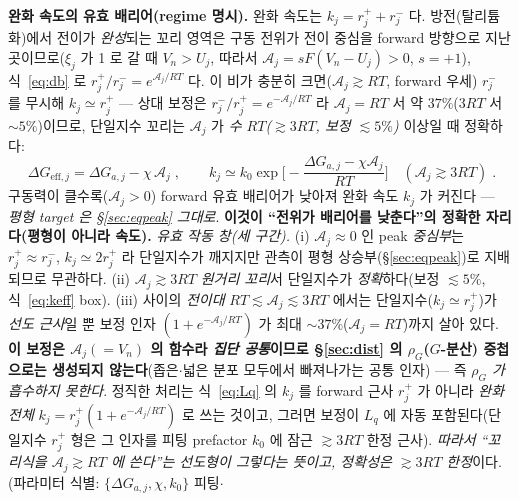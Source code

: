 \documentclass[11pt,a4paper]{article}
\newcommand{\eff}{\mathrm{eff}}
\begin{document}
\textbf{완화 속도의 유효 배리어(regime 명시).} 완화 속도는 $k_j=r_j^++r_j^-$ 다. 방전(탈리튬화)에서 전이가
\emph{완성}되는 꼬리 영역은 구동 전위가 전이 중심을 forward 방향으로 지난 곳이므로($\xi_j$ 가 1 로 갈 때
$V_n>U_j$, 따라서 $\mathcal A_j=sF(V_n-U_j)>0$, $s=+1$), 식~\eqref{eq:db} 로 $r_j^+/r_j^-=e^{\mathcal A_j/RT}$ 다.
이 비가 충분히 크면($\mathcal A_j\gtrsim RT$, forward 우세) $r_j^-$ 를 무시해 $k_j\simeq r_j^+$ — 상대 보정은
$r_j^-/r_j^+=e^{-\mathcal A_j/RT}$ 라 $\mathcal A_j=RT$ 서 약 $37\%$($3RT$ 서 $\sim5\%$)이므로, 단일지수 꼬리는 $\mathcal A_j$ 가
\emph{수 $RT$($\gtrsim3RT$, 보정 $\lesssim5\%$)} 이상일 때 정확하다:
\begin{equation}
\boxed{\;\Delta G_{\eff,j}=\Delta G_{a,j}-\chi\,\mathcal A_j\;,\qquad
k_j\simeq k_0\exp\!\Big[-\frac{\Delta G_{a,j}-\chi\mathcal A_j}{RT}\Big]\quad(\mathcal A_j\gtrsim 3RT)\;.}
\label{eq:keff}
\end{equation}
구동력이 클수록($\mathcal A_j>0$) forward 유효 배리어가 낮아져 완화 속도 $k_j$ 가 커진다 — \emph{평형 target 은
\S\ref{sec:eqpeak} 그대로}. \textbf{이것이 ``전위가 배리어를 낮춘다''의 정확한 자리다(평형이 아니라 속도).}
\emph{유효 작동 창(세 구간).} (i) $\mathcal A_j\approx0$ 인 peak \emph{중심부}는 $r_j^+\approx r_j^-$, $k_j\simeq2r_j^+$ 라
단일지수가 깨지지만 관측이 평형 상승부(\S\ref{sec:eqpeak})로 지배되므로 무관하다. (ii) $\mathcal A_j\gtrsim3RT$ \emph{원거리
꼬리}서 단일지수가 \emph{정확}하다(보정 $\lesssim5\%$, 식~\eqref{eq:keff} box). (iii) 사이의 \emph{전이대}
$RT\lesssim\mathcal A_j\lesssim3RT$ 에서는 단일지수($k_j\simeq r_j^+$)가 \emph{선도 근사}일 뿐 보정 인자
$(1+e^{-\mathcal A_j/RT})$ 가 최대 $\sim37\%$($\mathcal A_j=RT$)까지 살아 있다. \textbf{이 보정은 $\mathcal A_j(=V_n)$ 의 함수라
\emph{집단 공통}이므로 \S\ref{sec:dist} 의 $\rho_G$($G$-분산) 중첩으로는 생성되지 않는다}(좁은$\cdot$넓은 분포 모두에서
빠져나가는 공통 인자) — 즉 \emph{$\rho_G$ 가 흡수하지 못한다}. 정직한 처리는 식~\eqref{eq:Lq} 의 $k_j$ 를 forward
근사 $r_j^+$ 가 아니라 \emph{완화 전체} $k_j=r_j^+(1+e^{-\mathcal A_j/RT})$ 로 쓰는 것이고, 그러면 보정이 $L_q$ 에 자동
포함된다(단일지수 $r_j^+$ 형은 그 인자를 피팅 prefactor $k_0$ 에 잠근 $\gtrsim3RT$ 한정 근사). \emph{따라서 ``꼬리식을
$\mathcal A_j\gtrsim RT$ 에 쓴다''는 선도형이 그렇다는 뜻이고, 정확성은 $\gtrsim3RT$ 한정}이다. (파라미터 식별: $\{\Delta G_{a,j},\chi,k_0\}$ 피팅$\cdot$
\end{document}
